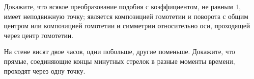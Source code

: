 \documentclass[a4paper,12pt]{article}
\begin{document}
Докажите, что всякое преобразование подобия с коэффициентом, не равным $1$,\\
имеет неподвижную точку;
является композицией гомотетии и поворота с общим центром или композицией гомотетии и симметрии относительно оси, проходящей через центр гомотетии.

На стене висят двое часов, одни побольше, другие поменьше. Докажите, что прямые, соединяющие концы минутных стрелок в разные моменты времени, проходят через одну точку.

\end{document}
